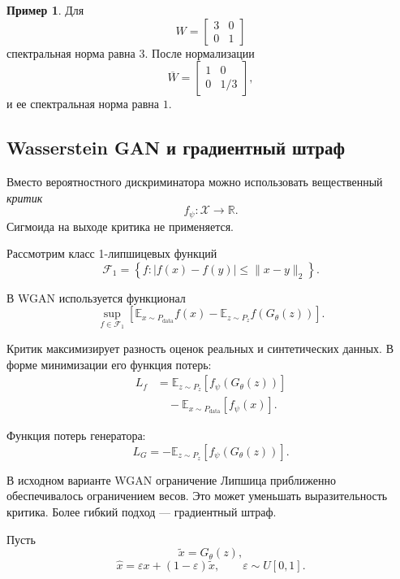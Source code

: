 \documentclass[12pt,a4paper]{article}
\newcommand{\R}{\mathbb{R}}
\newcommand{\E}{\mathbb{E}}
\numberwithin{equation}{section}
\theoremstyle{definition}
\newtheorem{example}[theorem]{Пример}
\theoremstyle{remark}
\begin{document}
\begin{example}
Для
\[
    W=
    \begin{bmatrix}
        3&0\\
        0&1
    \end{bmatrix}
\]
спектральная норма равна \(3\). После нормализации
\[
    \overline{W}
    =
    \begin{bmatrix}
        1&0\\
        0&1/3
    \end{bmatrix},
\]
и ее спектральная норма равна \(1\).
\end{example}

\subsection{Wasserstein GAN и градиентный штраф}

Вместо вероятностного дискриминатора можно использовать вещественный
\emph{критик}
\[
    f_\psi:\mathcal{X}\to\R.
\]
Сигмоида на выходе критика не применяется.

Рассмотрим класс 1-липшицевых функций
\[
    \mathcal{F}_1
    =
    \left\{
        f:
        |f(x)-f(y)|
        \leq
        \|x-y\|_2
    \right\}.
\]

В WGAN используется функционал
\[
    \sup_{f\in\mathcal{F}_1}
    \left[
        \E_{x\sim P_{\mathrm{data}}}f(x)
        -
        \E_{z\sim P_z}f(G_\theta(z))
    \right].
\]

Критик максимизирует разность оценок реальных и синтетических данных.
В форме минимизации его функция потерь:
\[
\begin{split}
    L_f
    &=
    \E_{z\sim P_z}[f_\psi(G_\theta(z))]\\
    &\quad-
    \E_{x\sim P_{\mathrm{data}}}[f_\psi(x)].
\end{split}
\]

Функция потерь генератора:
\[
    L_G
    =
    -\E_{z\sim P_z}[f_\psi(G_\theta(z))].
\]

В исходном варианте WGAN ограничение Липшица приближенно обеспечивалось
ограничением весов. Это может уменьшать выразительность критика.
Более гибкий подход --- градиентный штраф.

Пусть
\[
    \widetilde{x}=G_\theta(z),
\]
\[
    \widehat{x}
    =
    \varepsilon x+(1-\varepsilon)\widetilde{x},
    \qquad
    \varepsilon\sim U[0,1].
\]
\end{document}
